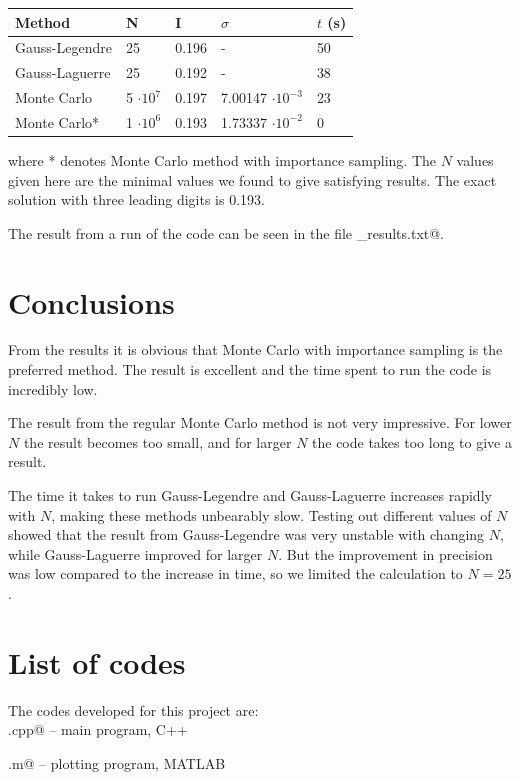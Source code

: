 \documentclass{article}
\begin{document}
\begin{multicols}{2}
\begin{center}
\begin{tabular}{ l l l l l}\hline
	Method 									& N	 				&I			&$\sigma$				& $t$ (s) \\ \hline
	Gauss-Legendre 							& 25 					& 0.196		& -						& 50 \\
	Gauss-Laguerre 							& 25					& 0.192		& -						& 38 \\
	Monte Carlo 								& 5 $\cdot 10^7$ 		& 0.197		& 7.00147 $\cdot 10^{-3}$		& 23 \\
	Monte Carlo*					 			& 1 $\cdot 10^6$		& 0.193		& 1.73337 $\cdot 10^{-2}$		& 0 \\
	\hline
\end{tabular}
\end{center}
where * denotes Monte Carlo method with importance sampling. The $N$ values given here are the minimal values we found to give satisfying results. The exact solution with three leading digits is 0.193.

The result from a run of the code can be seen in the file \verb@selected_results.txt@.




\section{Conclusions}

From the results it is obvious that Monte Carlo with importance sampling is the preferred method. The result is excellent and the time spent to run the code is incredibly low.

The result from the regular Monte Carlo method is not very impressive. For lower $N$ the result becomes too small, and for larger $N$ the code takes too long to give a result.

The time it takes to run Gauss-Legendre and Gauss-Laguerre increases rapidly with $N$, making these methods unbearably slow. Testing out different values of $N$ showed that the result from Gauss-Legendre was very unstable with changing $N$, while Gauss-Laguerre improved for larger $N$. But the improvement in precision was low compared to the increase in time, so we limited the calculation to $N = 25$. 





\section{List of codes}

The codes developed for this project are:\\

\noindent \verb@main.cpp@ -- main program, C++

\noindent \verb@plotting.m@ -- plotting program, MATLAB

\end{multicols}
\end{document}
